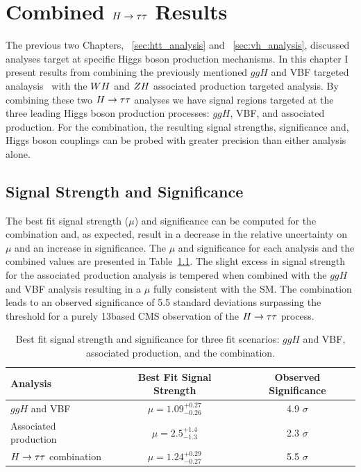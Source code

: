 \chapter{Combined $H\to\tau\tau$ Results}
\label{sec:cmb_results}

The previous two Chapters, ~\ref{sec:htt_analysis} and ~\ref{sec:vh_analysis}, discussed
analyses target at specific Higgs boson production mechanisms. In this chapter
I present results from combining the previously mentioned 
$ggH$ and VBF targeted analaysis~\cite{cms_13TeV_htt_jhep_2017}
with the $WH$ and $ZH$ associated production targeted analysis.
By combining these two $H\to\tau\tau$ analyses we have signal regions targeted at the three leading Higgs 
boson production processes: $ggH$, VBF, and associated production. 
For the combination, the resulting signal strengths, significance and, Higgs
boson couplings can be probed with greater precision than either analysis alone.

\section{Signal Strength and Significance}
The best fit signal strength ($\mu$) and significance can be computed for the combination and, 
as expected, result in a decrease in the relative uncertainty on $\mu$ and an increase
in significance. The $\mu$ and significance
for each analysis and the combined values are presented in Table~\ref{tab:cmb_mu_and_sig}.
The slight excess in signal strength for the associated production analysis is tempered
when combined with the $ggH$ and VBF analysis resulting in a $\mu$ fully consistent 
with the SM. The combination leads to an 
observed significance of 5.5 standard deviations surpassing the threshold for a
purely 13\TeV based CMS observation of the $H\to\tau\tau$ process. 

\begin{table}[htbp]
\renewcommand{\arraystretch}{1.3}
\centering
\begin{tabular}{lcc}
Analysis         &   Best Fit Signal Strength    &   Observed Significance    \\
\hline
$ggH$ and VBF             &   $\mu = 1.09 ^{+0.27} _{-0.26}$   &  4.9 $\sigma$     \\
Associated production     &   $\mu = 2.5  ^{+1.4}  _{-1.3}$    &  2.3 $\sigma$     \\
$H\to\tau\tau$ combination        &   $\mu = 1.24 ^{+0.29} _{-0.27}$   &  5.5 $\sigma$     \\
\hline
\end{tabular}
\caption{
Best fit signal strength and significance for three fit scenarios: $ggH$ and VBF,
associated production, and the combination.
}
\label{tab:cmb_mu_and_sig}
\end{table}


